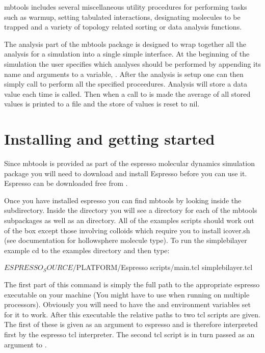 mbtools includes several miscellaneous utility procedures for
performing tasks such as warmup, setting tabulated interactions,
designating molecules to be trapped and a variety of topology related
sorting or data analysis functions.

The analysis part of the mbtools package is designed to wrap together
all the analysis for a simulation into a single simple interface. At
the beginning of the simulation the user specifies which analyses
should be performed by appending its name and arguments to a variable,
. After the analysis is setup one can then
simply call  to perform all the specified
proceedures. Analysis will store a data value each time
 is called. Then when a call to
 is made the average of all stored values is
printed to a file and the store of values is reset to nil.

\section{Installing and getting started}

Since mbtools is provided as part of the espresso molecular dynamics
simulation package you will need to download and install Espresso
before you can use it. Espresso can be downloaded free from
.

Once you have installed espresso you can find mbtools by looking
inside the  subdirectory. Inside the
 directory you will see a directory for each
of the mbtools subpackages as well as an 
directory. All of the examples scripts should work out of the box
except those involving colloids which require you to install icover.sh
(see documentation for hollowsphere molecule type). To run the
simplebilayer example cd to the examples directory and then type:

\begin{code}
  $ESPRESSO_SOURCE/$PLATFORM/Espresso scripts/main.tcl simplebilayer.tcl
\end{code}

The first part of this command is simply the full path to the
appropriate espresso executable on your machine (You might have to use
 when running on multiple processors). Obviously
you will need to have the  and
 environment variables set for it to work. After
this executable the relative paths to two tcl scripts are given. The
first of these  is given as an argument to espresso
and is therefore interpreted first by the espresso tcl
interpreter. The second tcl script  is in
turn passed as an argument to .

